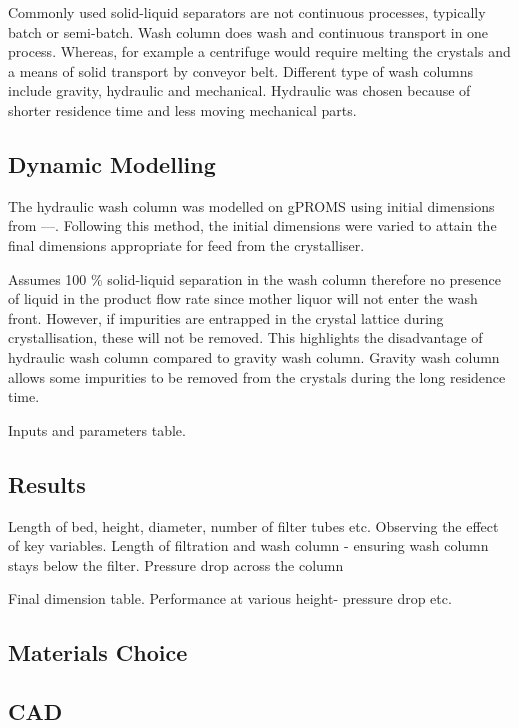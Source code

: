 Commonly used solid-liquid separators are not continuous processes, typically batch or semi-batch. Wash column does wash and continuous transport in one process. Whereas, for example a centrifuge would require  melting the crystals and a means of solid transport by conveyor belt. Different type of wash columns include gravity, hydraulic and mechanical. Hydraulic was chosen because of shorter residence time and less moving mechanical parts. 

\subsection{Dynamic Modelling}
The hydraulic wash column was modelled on gPROMS using initial dimensions from ---. Following this method, the initial dimensions were varied to attain the final dimensions appropriate for feed from the crystalliser. 

Assumes 100 \% solid-liquid separation in the wash column therefore no presence of liquid in the product flow rate since mother liquor will not enter the wash front. However, if impurities are entrapped in the crystal lattice during crystallisation, these will not be removed. This highlights the disadvantage of hydraulic wash column compared to gravity wash column. Gravity wash column allows some impurities to be removed from the crystals during the long residence time. 

Inputs and parameters table. 

\subsection{Results}
Length of bed, height, diameter, number of filter tubes etc. Observing the effect of key variables. Length of filtration and wash column - ensuring wash column stays below the filter. Pressure drop across the column

Final dimension table. 
Performance at various height- pressure drop etc. 

\subsection{Materials Choice}

\subsection{CAD}

